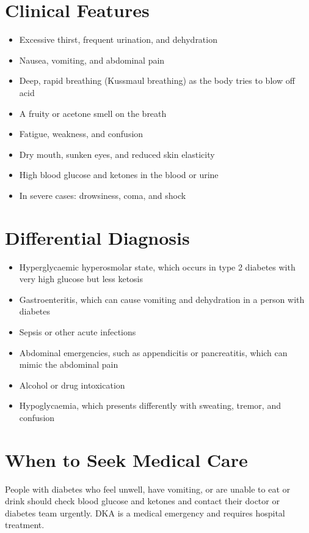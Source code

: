 \section*{Clinical Features}
\begin{itemize}
    \item Excessive thirst, frequent urination, and dehydration
    \item Nausea, vomiting, and abdominal pain
    \item Deep, rapid breathing (Kussmaul breathing) as the body tries to blow off acid
    \item A fruity or acetone smell on the breath
    \item Fatigue, weakness, and confusion
    \item Dry mouth, sunken eyes, and reduced skin elasticity
    \item High blood glucose and ketones in the blood or urine
    \item In severe cases: drowsiness, coma, and shock
\end{itemize}

\section*{Differential Diagnosis}
\begin{itemize}
    \item Hyperglycaemic hyperosmolar state, which occurs in type 2 diabetes with very high glucose but less ketosis
    \item Gastroenteritis, which can cause vomiting and dehydration in a person with diabetes
    \item Sepsis or other acute infections
    \item Abdominal emergencies, such as appendicitis or pancreatitis, which can mimic the abdominal pain
    \item Alcohol or drug intoxication
    \item Hypoglycaemia, which presents differently with sweating, tremor, and confusion
\end{itemize}

\section*{When to Seek Medical Care}
People with diabetes who feel unwell, have vomiting, or are unable to eat or drink should check blood glucose and ketones and contact their doctor or diabetes team urgently. DKA is a medical emergency and requires hospital treatment.

